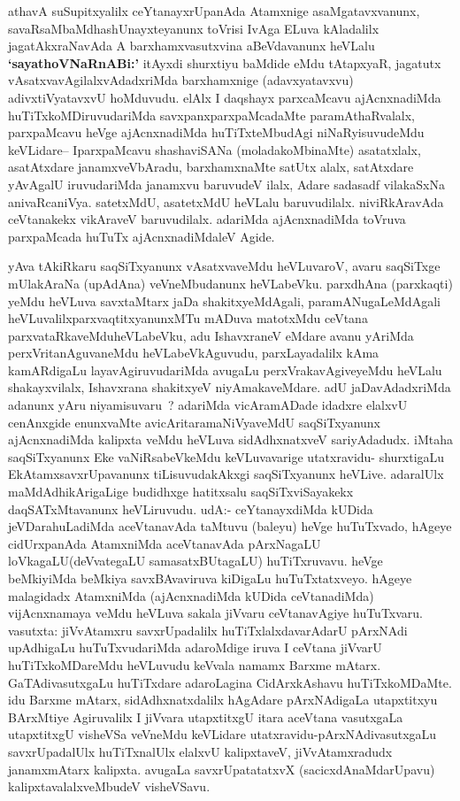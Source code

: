 \begin{artha}
athavA suSupitxyalilx ceYtanayxrUpanAda Atamxnige asaMgatavxvanunx,
savaR\-saMbaMdhashUnayxteyanunx toVrisi IvAga ELuva kAladalilx
jagatAkxraNavAda A barxhamxvasutxvina aBeVdavanunx heVLalu
\textbf{`sayathoVNaRnABi:'} \mdash itAyxdi shurxtiyu baMdide eMdu tAtapxyaR,
jagatutx vAsatxvavAgilalxvAdadxriMda barxhamxnige (adavxyatavxvu)
adivxtiVyatavxvU hoMduvudu. elAlx I daqshayx parxcaMcavu ajAcnxnadiMda
huTiTxkoMDiruvudariMda savxpanxparxpaMcadaMte paramAthaRvalalx,
parxpaMcavu heVge ajAcnxnadiMda huTiTxteMbudAgi niNaRyisuvudeMdu
keVLidare-- I\break parxpaMcavu shashaviSANa (moladakoMbinaMte) asatatxlalx,
asatAtxdare janamxveVbAradu, barxhamxnaMte satUtx alalx, satAtxdare
yAvAgalU iruvudariMda janamxvu baruvudeV ilalx, Adare sadasadf
vilakaSxNa anivaRcaniVya. satetxMdU, asatetxMdU heVLalu
baruvudilalx. niviRkAravAda ceVtanakekx vikAraveV
baruvudilalx. adariMda ajAcnxnadiMda toVruva parxpaMcada huTuTx
ajAcnxnadiMdaleV Agide.
\end{artha}

\begin{artha}
yAva tAkiRkaru saqSiTxyanunx vAsatxvaveMdu heVLuvaroV, avaru saqSiTxge
 mUlakAraNa (upAdAna) veVneMbudanunx heVLabeVku. parxdhAna
(parxkaqti) yeMdu heVLuva savxtaMtarx jaDa shakitxyeMdAgali,
paramANugaLeMdAgali heVLuvalilx\break parxvaqtitxyanunxMTu mADuva matotxMdu
ceVtana parxvataRkaveMduheVLabeVku, adu 	 IshavxraneV eMdare avanu
yAriMda perxVritanAguvaneMdu heVLabeVkAguvudu,  parxLayadalilx kAma
kamARdigaLu layavAgiruvudariMda avugaLu perxVrakavAgiveyeMdu heVLalu
shakayxvilalx, Ishavxrana shakitxyeV
niyAmakaveMdare. adU jaDavAdadxriMda adanunx yAru niyamisuvaru~?
adariMda vicAramADade idadxre elalxvU cenAnxgide enunxvaMte
avicAritaramaNiVyaveMdU saqSiTxyanunx ajAcnxnadiMda kalipxta veMdu
heVLuva sidAdhxnatxveV sariyAdadudx. iMtaha saqSiTxyanunx Eke
vaNiRsabeVkeMdu keVLuvavarige utatxravidu- shurxtigaLu
EkAtamxsavxrUpavanunx tiLisuvudakAkxgi saqSiTxyanunx
heVLive. adaralUlx maMdAdhikArigaLige budidhxge hatitxsalu
saqSiTxviSayakekx daqSATxMtavanunx heVLiruvudu. udA:-
ceYtanayxdiMda kUDida jeVDarahuLadiMda aceVtanavAda taMtuvu (baleyu) heVge
huTuTxvado, hAgeye cidUrxpanAda AtamxniMda aceVtanavAda pArxNagaLU
loVkagaLU(deVvategaLU samasatxBUtagaLU) huTiTxruvavu. heVge beMkiyiMda
beMkiya savxBAvaviruva kiDigaLu huTuTxtatxveyo. hAgeye malagidadx
AtamxniMda (ajAcnxnadiMda kUDida ceVtanadiMda) vijAcnxnamaya veMdu
heVLuva sakala jiVvaru ceVtanavAgiye huTuTxvaru. vasutxta: jiVvAtamxru
savxrUpadalilx huTiTxlalxdavarAdarU pArxNAdi upAdhigaLu
huTuTxvudariMda adaroMdige iruva I ceVtana jiVvarU huTiTxkoMDareMdu
heVLuvudu keVvala namamx Barxme mAtarx. GaTAdivasutxgaLu huTiTxdare
adaroLagina CidArxkAshavu huTiTxkoMDaMte. idu Barxme mAtarx,
sidAdhxnatxdalilx hAgAdare pArxNAdigaLa utapxtitxyu BArxMtiye
Agiruvalilx I jiVvara utapxtitxgU itara aceVtana vasutxgaLa
utapxtitxgU visheVSa veVneMdu keVLidare utatxravidu-pArxNAdivasutxgaLu
savxrUpadalUlx huTiTxnalUlx elalxvU kalipxtaveV, jiVvAtamxradudx
janamxmAtarx kalipxta. avugaLa savxrUpatatatxvX (sacicxdAnaMdarUpavu)
kalipxtavalalxveMbudeV visheVSavu.
\end{artha}


